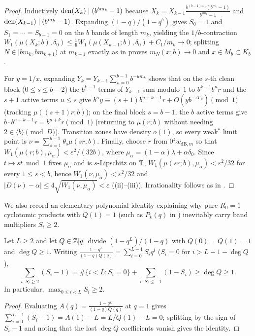\documentclass[11pt]{article}
\begin{document}
\begin{proof}
Inductively $\operatorname{den}(X_k)\mid(b^{bm_k}-1)$ because $X_k=X_{k-1}\frac{b^{(b-1)m_k}(b^{m_k}-1)}{b^{bm_k}-1}$ and $\operatorname{den}(X_{k-1})\mid(b^{m_k}-1)$. Expanding $(1-q)/(1-q^b)$ gives $S_0=1$ and $S_1=\cdots=S_{b-1}=0$ on the $b$ bands of length $m_k$, yielding the $1/b$-contraction $W_1(\mu(X_k;b),\delta_0)\le\frac1b W_1(\mu(X_{k-1};b),\delta_0)+C_1/m_k\to0$; splitting $N\in[bm_k,bm_{k+1})$ at $m_{k+1}$ exactly as in  proves $m_N(x;b)\to0$ and $x\in M_b\subset K_b$.

For $y=1/x$, expanding $Y_k=Y_{k-1}\sum_{u=0}^{b-1}b^{-um_k}$ shows that on the $s$-th clean block ($0\le s\le b-2$) the $b^{k-1}$ terms of $Y_{k-1}$ sum modulo~$1$ to $b^{k-1}b^nr$ and the $s+1$ active terms $u\le s$ give $b^ny\equiv(s+1)b^{n+k-1}r+O(yb^{-\Delta'_k})\pmod1$ (tracking $\mu((s+1)r;b)$); on the final block $s=b-1$, the $b$ active terms give $b\cdot b^{n+k-1}r=b^{n+k}r\pmod1$ (returning to $\mu(r;b)$ without needing $2\in\langle b\rangle\pmod D$). Transition zones have density $o(1)$, so every weak$^*$ limit point is $\nu=\sum_{s=1}^{b-1}\theta_s\mu(sr;b)$. Finally, choose $r$ from $0^z w_{\mathrm{dB},m}$ so that $W_1(\mu(r;b),\mu_\alpha)<\varepsilon^2/(32b)$, where $\mu_\alpha=(1-\alpha)\lambda+\alpha\delta_0$. Since $t\mapsto st\bmod1$ fixes $\mu_\alpha$ and is $s$-Lipschitz on $\mathbb T$, $W_1(\mu(sr;b),\mu_\alpha)<\varepsilon^2/32$ for every $1\le s<b$, hence $W_1(\nu,\mu_\alpha)<\varepsilon^2/32$ and $|D(\nu)-\alpha|\le 4\sqrt{W_1(\nu,\mu_\alpha)}<\varepsilon$ ((ii)--(iii)). Irrationality follows as in .
\end{proof}

We also record an elementary polynomial identity explaining why pure $R_0=1$ cyclotomic products with $Q(1)=1$ (such as $P_k(q)$ in ) inevitably carry band multipliers $S_i\ge2$.

\begin{proposition}[$Q(1)=1$ coefficient excess identity]\label{prop:Q1-excess}
Let $L\ge2$ and let $Q\in\mathbb Z[q]$ divide $(1-q^L)/(1-q)$ with $Q(0)=Q(1)=1$ and $\deg Q\ge1$. Writing $\frac{1-q^L}{(1-q)Q(q)}=\sum_{i=0}^{L-1}S_iq^i$ ($S_i=0$ for $i>L-1-\deg Q$),
\[
\sum_{i:\,S_i\ge2}(S_i-1)=\#\{i<L:S_i=0\}+\sum_{i:\,S_i\le-1}(1-S_i)\ge\deg Q\ge1.
\]
In particular, $\max_{0\le i<L}S_i\ge2$.
\end{proposition}

\begin{proof}
Evaluating $A(q)=\frac{1-q^L}{(1-q)Q(q)}$ at $q=1$ gives $\sum_{i=0}^{L-1}(S_i-1)=A(1)-L=L/Q(1)-L=0$; splitting by the sign of $S_i-1$ and noting that the last $\deg Q$ coefficients vanish gives the identity.
\end{proof}
\end{document}
